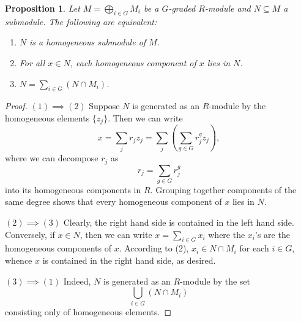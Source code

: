 \documentclass[11pt]{article}
\theoremstyle{thmstyle}
\newtheorem{proposition}[theorem]{Proposition}
\theoremstyle{defstyle}
\begin{document}
\begin{proposition}
    Let $\displaystyle M = \bigoplus_{i\in G} M_i$ be a $G$-graded $R$-module and $N\subseteq M$ a submodule. The following are equivalent: 
    \begin{enumerate}[label=(\arabic*)]
        \item $N$ is a homogeneous submodule of $M$.
        \item For all $x\in N$, each homogeneous component of $x$ lies in $N$.
        \item $\displaystyle N = \sum_{i\in G}(N\cap M_i)$.
    \end{enumerate}
\end{proposition}
\begin{proof}
    $(1)\implies(2)$ Suppose $N$ is generated as an $R$-module by the homogeneous elements $\{z_j\}$. Then we can write 
    \begin{equation*}
        x = \sum_j r_j z_j = \sum_{j}\left(\sum_{g\in G} r_j^g z_j\right),
    \end{equation*}
    where we can decompose $r_j$ as
    \begin{equation*}
        r_j = \sum_{g\in G} r_j^g
    \end{equation*}
    into its homogeneous components in $R$. Grouping together components of the same degree shows that every homogeneous component of $x$ lies in $N$. 

    $(2)\implies(3)$ Clearly, the right hand side is contained in the left hand side. Conversely, if $x\in N$, then we can write $x = \sum_{i\in G} x_i$ where the $x_i$'s are the homogeneous components of $x$. According to (2), $x_i\in N\cap M_i$ for each $i\in G$, whence $x$ is contained in the right hand side, as desired. 

    $(3)\implies(1)$ Indeed, $N$ is generated as an $R$-module by the set 
    \begin{equation*}
        \bigcup_{i\in G} (N\cap M_i)
    \end{equation*}
    consisting only of homogeneous elements.
\end{proof}
\end{document}
